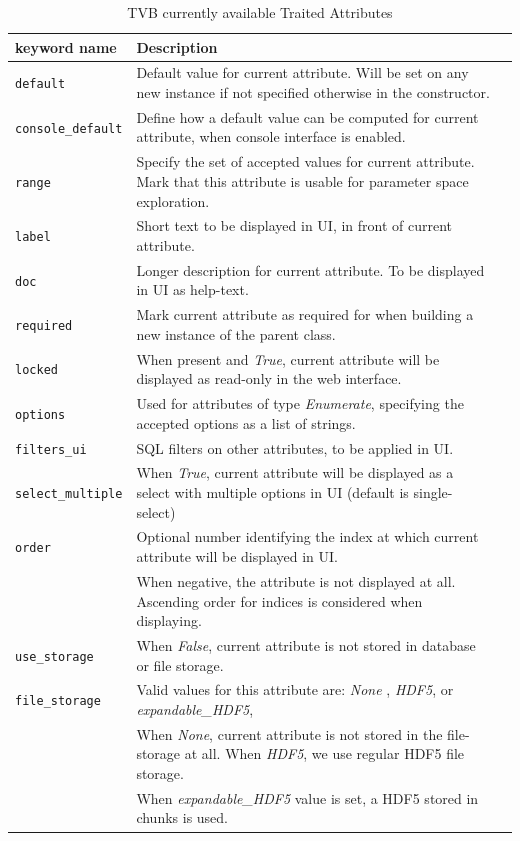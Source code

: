 \documentclass{bioinfo}
\begin{document}
\begin{center}
	\begin{table}[ht]
		\begin{tabularx}{\textwidth}{lll}
			\toprule
			keyword name & Description  \\
			\midrule
			\texttt{default}          & Default value for current attribute. Will be set on any new instance if not specified otherwise in the constructor.  \\
			\texttt{console\_default} & Define how a default value can be computed for current attribute, when console interface is enabled. \\
			\texttt{range}            & Specify the set of accepted values for current attribute. Mark that this attribute is usable for parameter space exploration. \\
			\texttt{label}            & Short text to be displayed in UI, in front of current attribute. \\
			\texttt{doc}              & Longer description for current attribute. To be displayed in UI as help-text. \\
			\texttt{required}         & Mark current attribute as required for when building a new instance of the parent class. \\
			\texttt{locked}           & When present and \emph{True}, current attribute will be displayed as read-only in the web interface. \\
			\texttt{options}          & Used for attributes of type \emph{Enumerate}, specifying the accepted options as a list of strings. \\
			\texttt{filters\_ui}      & SQL filters on other attributes, to be applied in UI. \\
			\texttt{select\_multiple} & When \emph{True}, current attribute will be displayed as a select with multiple options in UI (default is single-select) \\
			\texttt{order}            & Optional number identifying the index at which current attribute will be displayed in UI. \\
						  & When negative, the attribute is not displayed at all. Ascending order for indices is considered when displaying. \\
			\texttt{use\_storage}     & When \emph{False}, current attribute is not stored in database or file storage. \\
			\texttt{file\_storage}    & Valid values for this attribute are: \emph{None} , \emph{HDF5}, or  \emph{expandable\_HDF5}, \\
						  & When \emph{None}, current attribute is not stored in the file-storage at all. When \emph{HDF5}, we use regular HDF5 file storage. \\
						  & When \emph{expandable\_HDF5} value is set, a HDF5 stored in chunks is used. \\
			\bottomrule
			\end{tabularx}
  	\caption{TVB currently available Traited Attributes}
  	\label{tab:traits}
	\end{table}
\end{center}
\end{document}
